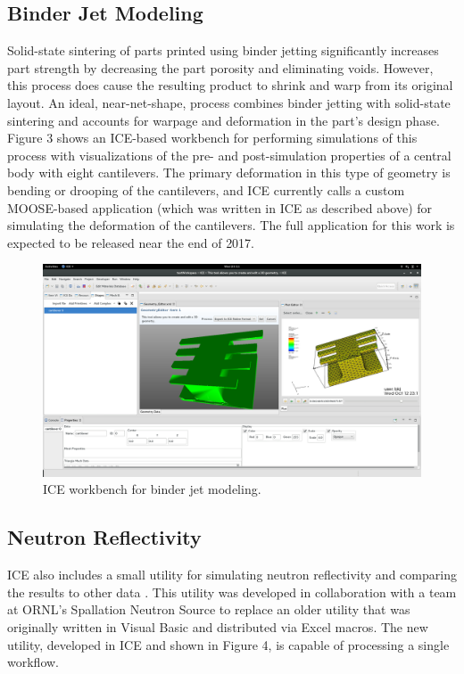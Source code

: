 \subsection{Binder Jet Modeling}\label{binder-jet-modeling}

Solid-state sintering of parts printed using binder jetting
significantly increases part strength by decreasing the part porosity
and eliminating voids. However, this process does cause the resulting
product to shrink and warp from its original layout. An ideal, near-net-shape, 
process combines binder jetting with solid-state sintering and accounts
for warpage and deformation in the part's design phase. 
Figure 3 shows an ICE-based workbench for performing simulations of
this process with visualizations of the pre- and post-simulation
properties of a central body with eight cantilevers. The primary
deformation in this type of geometry is bending or drooping of the
cantilevers, and ICE currently calls a custom MOOSE-based application
(which was written in ICE as described above) for simulating the
deformation of the cantilevers. The full application for this work 
is expected to be released near the end of 2017.

\begin{figure}[H]
\centering
\includegraphics[width=\textwidth]{images/ice-bjm.png}
\caption{ICE workbench for binder jet modeling.}
\end{figure}

\subsection{Neutron Reflectivity}\label{neutron-reflectivity}

ICE also includes a small utility for simulating neutron reflectivity and
comparing the results to other data \cite{billings_brand_2015}. This 
utility was developed in collaboration with a team at ORNL's Spallation Neutron 
Source to replace an older utility that was originally written in Visual Basic and 
distributed via Excel macros. The new utility, developed in ICE and 
shown in Figure 4, is capable of processing a single workflow.

